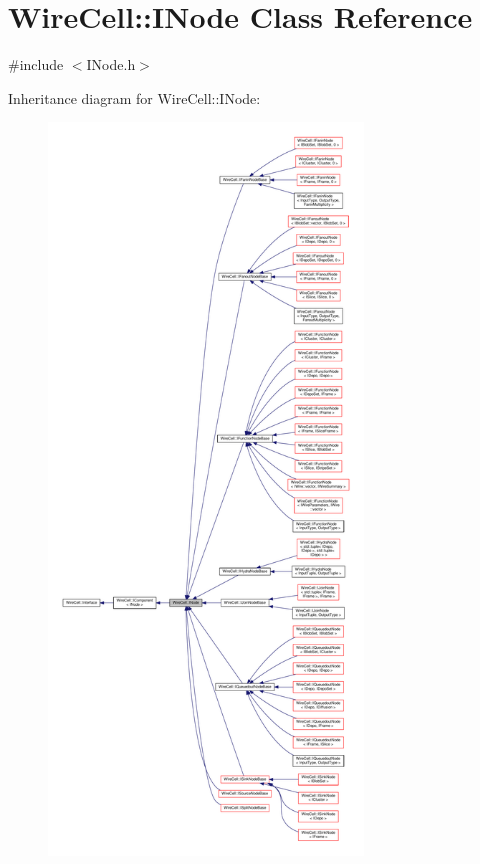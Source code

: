 \hypertarget{class_wire_cell_1_1_i_node}{}\section{Wire\+Cell\+:\+:I\+Node Class Reference}
\label{class_wire_cell_1_1_i_node}


{\ttfamily \#include $<$I\+Node.\+h$>$}



Inheritance diagram for Wire\+Cell\+:\+:I\+Node\+:
\nopagebreak
\begin{figure}[H]
\begin{center}
\leavevmode
\includegraphics[height=550pt]{class_wire_cell_1_1_i_node__inherit__graph}
\end{center}
\end{figure}



